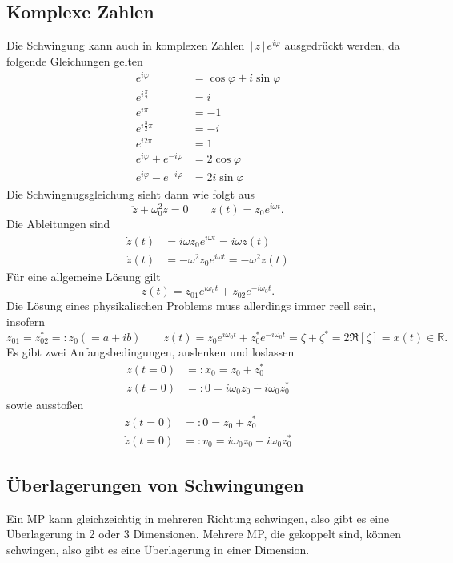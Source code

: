 \documentclass[a4paper,12pt]{article}
\numberwithin{equation}{section}
\begin{document}
\subsection{Komplexe Zahlen}
Die Schwingung kann auch in komplexen Zahlen $\,|\, z\,|\, e^{i\varphi }$ ausgedrückt werden, da folgende Gleichungen gelten
\begin{align*}
        e^{i\varphi }&=\cos \varphi +i\sin \varphi \\
        e^{i\tfrac{\pi }{2}}&=i\\
        e^{i\pi }&=-1\\
        e^{i\tfrac{3}{2}\pi }&=-i\\
        e^{i2\pi }&=1\\
        e^{i\varphi }+e^{-i\varphi }&=2\cos \varphi \\
        e^{i\varphi }-e^{-i\varphi }&=2i\sin \varphi 
\end{align*}
Die Schwingnugsgleichung sieht dann wie folgt aus
\[ 
        \ddot{z}+\omega _0^2z=0\qquad z\left(t\right)=z_0e^{i\omega t}
.\] 
Die Ableitungen sind
\begin{align*} %
        \dot{z}\left(t\right)&=i\omega z_0e^{i\omega t}=i\omega z\left(t\right)\\
        \ddot{z}\left(t\right)&=-\omega ^2z_0e^{i\omega t}=-\omega ^2z\left(t\right)
\end{align*}
Für eine allgemeine Lösung gilt
\[ 
        z\left(t\right)=z_{01}e^{i\omega _0t}+z_{02}e^{-i\omega _0t}
.\] 
Die Lösung eines physikalischen Problems muss allerdings immer reell sein, insofern
\[ 
        z_{01}=z_{02}^*=:z_0\left(=a+ib\right)\qquad z\left(t\right)=z_0e^{i\omega _0t}+z_0^*e^{-i\omega _0t}=\zeta +\zeta ^*=2 \mathfrak{R}[\zeta ]=x\left(t\right) \in \mathbb{R}
.\] 
Es gibt zwei Anfangsbedingungen, auslenken und loslassen
\begin{align*} %
        z\left(t=0\right)&=:x_0=z_0+z_0^*\\
        \dot{z}\left(t=0\right)&=:0=i\omega _0z_0-i\omega _0z_0^*
\end{align*}
sowie ausstoßen
\begin{align*}
        z\left(t=0\right)&=:0=z_0+z_0^*\\
        \dot{z}\left(t=0\right)&=:v_0=i\omega _0z_0-i\omega _0z_0^*
\end{align*}

\subsection{Überlagerungen von Schwingungen}
Ein MP kann gleichzeichtig in mehreren Richtung schwingen, also gibt es eine Überlagerung in 2 oder 3 Dimensionen. Mehrere MP, die gekoppelt sind, können schwingen, also gibt es eine Überlagerung in einer Dimension.
\end{document}
